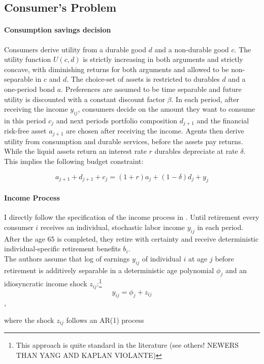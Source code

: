\documentclass[a4paper,12pt]{article}
\begin{document}
\subsection{Consumer's Problem} 
\paragraph{Consumption savings decision}
Consumers derive utility from a durable good $d$ and a non-durable good $c$. The utility function $U(c,d)$ is strictly increasing in both arguments and strictly concave, with diminishing returns for both arguments and allowed to be non-separable in $c$ and $d$. The choice-set of assets is restricted to durables $d$ and a one-period bond $a$. Preferences are assumed to be time separable and future utility is discounted with a constant discount factor $\beta$.
In each period, after receiving the income $y_{ij}$, consumers decide on the amount they want to consume in this period $c_{j}$ and next periods portfolio composition $d_{j+1}$ and the financial risk-free asset $a_{j+1}$ are chosen after receiving the income. Agents then derive utility from consumption and durable services, before the assets pay returns. While the liquid assets return an interest rate $r$ durables depreciate at rate $\delta$. This implies the following budget constraint:  

\begin{equation}
a_{j+1}+d_{j+1}+c_{j}=(1+r)a_{j} + (1-\delta)d_{j}+y_{j}
\end{equation}

\paragraph{Income Process}
I directly follow the specification of the income process in \cite{hintermaier2011}. Until retirement every consumer $i$ receives an individual, stochastic labor income $y_{ij}$ in each period. After the age 65 is completed, they retire with certainty and receive deterministic individual-specific retirement benefits $b_{i}$. \\
The authors assume that log of earnings $y_{ij}$ of individual $i$ at age $j$ before retirement is additively separable in a deterministic age polynomial $\phi_{j}$ and an idiosyncratic income shock $z_{ij}$:\footnote{This approach is quite standard in the literature (see others! NEWERS THAN YANG AND KAPLAN VIOLANTE) } 
\[y_{ij}=\phi_{j}+z_{ij}\],

where the shock $z_{ij}$ follows an AR(1) process
\end{document}
